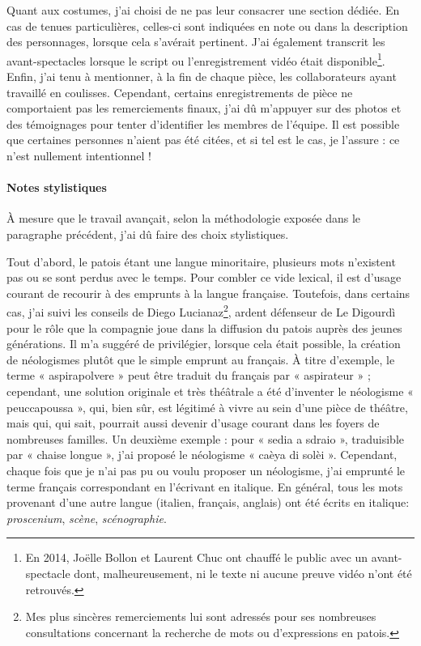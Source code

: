 Quant aux costumes, j'ai choisi de ne pas leur consacrer une section dédiée. En cas de tenues particulières, celles-ci sont indiquées en note ou dans la description des personnages, lorsque cela s’avérait pertinent.
J'ai également transcrit les avant-spectacles lorsque le script ou l'enregistrement vidéo était disponible\footnote{ En 2014, Jo\"elle Bollon et Laurent Chuc ont chauffé le public avec un avant-spectacle dont, malheureusement, ni le texte ni aucune preuve vidéo n'ont été retrouvés.}. Enfin, j’ai tenu à mentionner, à la fin de chaque pièce, les collaborateurs ayant travaillé en coulisses. Cependant, certains enregistrements de pièce ne comportaient pas les remerciements finaux, j’ai dû m’appuyer sur des photos et des témoignages pour tenter d’identifier les membres de l’équipe. Il est possible que certaines personnes n’aient pas été citées, et si tel est le cas, je l’assure : ce n’est nullement intentionnel !

\paragraph*{Notes stylistiques}
À mesure que le travail avançait, selon la méthodologie exposée dans le paragraphe précédent, j'ai dû faire des choix stylistiques.

Tout d’abord, le patois étant une langue minoritaire, plusieurs mots n'existent pas ou se sont perdus avec le temps. Pour combler ce vide lexical, il est d'usage courant de recourir à des emprunts à la langue française. Toutefois, dans certains cas, j'ai suivi les conseils de Diego Lucianaz\footnote{ Mes plus sincères remerciements lui sont adressés pour ses nombreuses consultations concernant la recherche de mots ou d'expressions en patois.}, ardent défenseur de Le Digourdì pour le rôle que la compagnie joue dans la diffusion du patois auprès des jeunes générations. Il m'a suggéré de privilégier, lorsque cela était possible, la création de néologismes plutôt que le simple emprunt au français. À titre d'exemple, le terme « aspirapolvere » peut être traduit du français par « aspirateur » ; cependant, une solution originale et très théâtrale a été d'inventer le néologisme « peuccapoussa », qui, bien sûr, est légitimé à vivre au sein d'une pièce de théâtre, mais qui, qui sait, pourrait aussi devenir d'usage courant dans les foyers de nombreuses familles. Un deuxième exemple : pour « sedia a sdraio », traduisible par « chaise longue », j'ai proposé le néologisme « caèya di solèi ».
Cependant, chaque fois que je n'ai pas pu ou voulu proposer un néologisme, j'ai emprunté le terme français correspondant en l'écrivant en italique. En général, tous les mots provenant d'une autre langue (italien, français, anglais) ont été écrits en italique: \textit{proscenium}, \textit{scène}, \textit{scénographie}.

